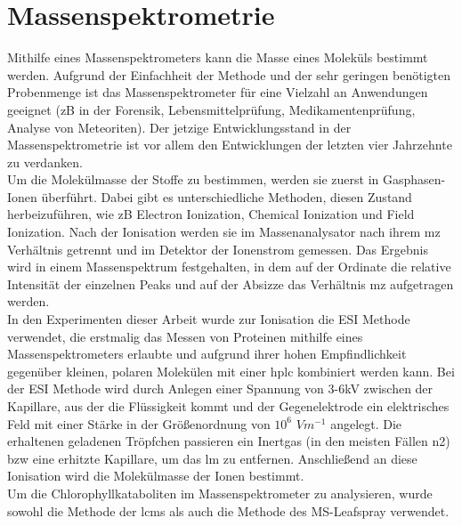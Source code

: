 \section{Massenspektrometrie}

Mithilfe eines Massenspektrometers kann die Masse eines Moleküls bestimmt werden. Aufgrund der Einfachheit der Methode und der sehr geringen benötigten Probenmenge ist das Massenspektrometer für eine Vielzahl an Anwendungen geeignet (\gls{zB} in der Forensik, Lebensmittelprüfung, Medikamentenprüfung, Analyse von Meteoriten). \cite[S. 1]{MassSpectrometry} Der jetzige Entwicklungsstand in der Massenspektrometrie ist vor allem den Entwicklungen der letzten vier Jahrzehnte zu verdanken. \cite[S. 6-9]{MassSpectrometry} \\

Um die Molekülmasse der Stoffe zu bestimmen, werden sie zuerst in Gasphasen-Ionen überführt. \cite[S. 15]{MassSpectrometry} Dabei gibt es unterschiedliche Methoden, diesen Zustand herbeizuführen, wie \gls{zB} Electron Ionization, Chemical Ionization und Field Ionization. \cite[S. 15-30]{MassSpectrometry} Nach der Ionisation werden sie im Massenanalysator nach ihrem \gls{mz} Verhältnis getrennt und im Detektor der Ionenstrom gemessen. Das Ergebnis wird in einem Massenspektrum festgehalten, in dem auf der Ordinate die relative Intensität der einzelnen Peaks und auf der Absizze das Verhältnis \gls{mz} aufgetragen werden. \\

In den Experimenten dieser Arbeit wurde zur Ionisation die \gls{ESI} Methode verwendet, die erstmalig das Messen von Proteinen mithilfe eines Massenspektrometers erlaubte und aufgrund ihrer hohen Empfindlichkeit gegenüber kleinen, polaren Molekülen mit einer \gls{hplc} kombiniert werden kann. Bei der \gls{ESI} Methode wird durch Anlegen einer Spannung von 3-6kV zwischen der Kapillare, aus der die Flüssigkeit kommt und der Gegenelektrode ein elektrisches Feld mit einer Stärke in der Größenordnung von $10^{6}$ $Vm^{-1}$ angelegt. Die erhaltenen geladenen Tröpfchen passieren ein Inertgas (in den meisten Fällen \gls{n2}) \gls{bzw} eine erhitzte Kapillare, um das \gls{lm} zu entfernen. Anschließend an diese Ionisation wird die Molekülmasse der Ionen bestimmt. \cite[S. 43-44]{MassSpectrometry} \\

Um die Chlorophyllkataboliten im Massenspektrometer zu analysieren, wurde sowohl die Methode der \gls{lcms} als auch die Methode des MS-Leafspray verwendet. 

